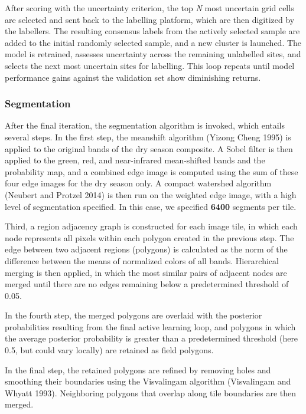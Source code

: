 \documentclass[11pt,a4paper]{article}
\begin{document}
After scoring with the uncertainty criterion, the top \emph{N} most
uncertain grid cells are selected and sent back to the labelling
platform, which are then digitized by the labellers. The resulting
consensus labels from the actively selected sample are added to the
initial randomly selected sample, and a new cluster is launched. The
model is retrained, assesses uncertainty across the remaining unlabelled
sites, and selects the next most uncertain sites for labelling. This
loop repeats until model performance gains against the validation set
show diminishing returns.

\hypertarget{segmentation}{%
\subsubsection{Segmentation}\label{segmentation}}

After the final iteration, the segmentation algorithm is invoked, which
entails several steps. In the first step, the meanshift algorithm
(Yizong Cheng 1995) is applied to the original bands of the dry season
composite. A Sobel filter is then applied to the green, red, and
near-infrared mean-shifted bands and the probability map, and a combined
edge image is computed using the sum of these four edge images for the
dry season only. A compact watershed algorithm (Neubert and Protzel
2014) is then run on the weighted edge image, with a high level of
segmentation specified. In this case, we specified \textbf{6400}
segments per tile.

Third, a region adjacency graph is constructed for each image tile, in
which each node represents all pixels within each polygon created in the
previous step. The edge between two adjacent regions (polygons) is
calculated as the norm of the difference between the means of normalized
colors of all bands. Hierarchical merging is then applied, in which the
most similar pairs of adjacent nodes are merged until there are no edges
remaining below a predetermined threshold of 0.05.

In the fourth step, the merged polygons are overlaid with the posterior
probabilities resulting from the final active learning loop, and
polygons in which the average posterior probability is greater than a
predetermined threshold (here 0.5, but could vary locally) are retained
as field polygons.

In the final step, the retained polygons are refined by removing holes
and smoothing their boundaries using the Visvalingam algorithm
(Visvalingam and Whyatt 1993). Neighboring polygons that overlap along
tile boundaries are then merged.
\end{document}

